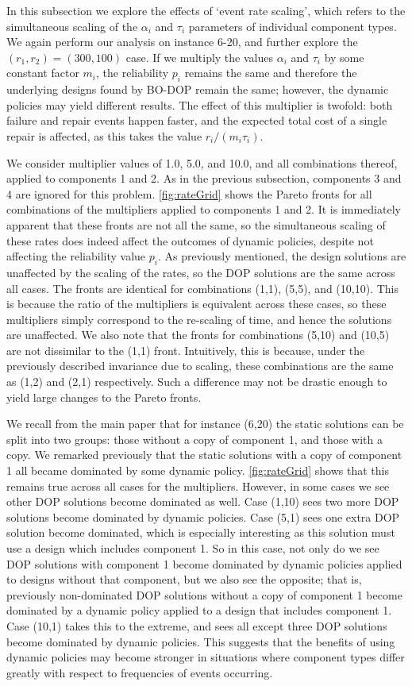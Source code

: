 \documentclass[11pt,authoryear,a4paper]{article}
\theoremstyle{definition}
\begin{document}
In this subsection we explore the effects of `event rate scaling', which refers to the simultaneous scaling of the $\alpha_i$ and $\tau_i$ parameters of individual component types. We again perform our analysis on instance 6-20, and further explore the $(r_1,r_2) = (300,100)$ case. If we multiply the values $\alpha_i$ and $\tau_i$ by some constant factor $m_i$, the reliability $p_i$ remains the same and therefore the underlying designs found by BO-DOP remain the same; however, the dynamic policies may yield different results. The effect of this multiplier is twofold: both failure and repair events happen faster, and the expected total cost of a single repair is affected, as this takes the value $r_i/(m_i\tau_i)$.

We consider multiplier values of 1.0, 5.0, and 10.0, and all combinations thereof, applied to components 1 and 2. As in the previous subsection, components 3 and 4 are ignored for this problem. \autoref{fig:rateGrid} shows the Pareto fronts for all combinations of the multipliers applied to components 1 and 2. It is immediately apparent that these fronts are not all the same, so the simultaneous scaling of these rates does indeed affect the outcomes of dynamic policies, despite not affecting the reliability value $p_i$. As previously mentioned, the design solutions are unaffected by the scaling of the rates, so the DOP solutions are the same across all cases. The fronts are identical for combinations (1,1), (5,5), and (10,10). This is because the ratio of the multipliers is equivalent across these cases, so these multipliers simply correspond to the re-scaling of time, and hence the solutions are unaffected. We also note that the fronts for combinations (5,10) and (10,5) are not dissimilar to the (1,1) front. Intuitively, this is because, under the previously described invariance due to scaling, these combinations are the same as (1,2) and (2,1) respectively. Such a difference may not be drastic enough to yield large changes to the Pareto fronts.

We recall from the main paper that for instance (6,20) the static solutions can be split into two groups: those without a copy of component 1, and those with a copy. We remarked previously that the static solutions with a copy of component 1 all became dominated by some dynamic policy. \autoref{fig:rateGrid} shows that this remains true across all cases for the multipliers. However, in some cases we see other DOP solutions become dominated as well. Case (1,10) sees two more DOP solutions become dominated by dynamic policies. Case (5,1) sees one extra DOP solution become dominated, which is especially interesting as this solution must use a design which includes component 1. So in this case, not only do we see DOP solutions with component 1 become dominated by dynamic policies applied to designs without that component, but we also see the opposite; that is, previously non-dominated DOP solutions without a copy of component 1 become dominated by a dynamic policy applied to a design that includes component 1. Case (10,1) takes this to the extreme, and sees all except three DOP solutions become dominated by dynamic policies. This suggests that the benefits of using dynamic policies may become stronger in situations where component types differ greatly with respect to frequencies of events occurring.
\end{document}
